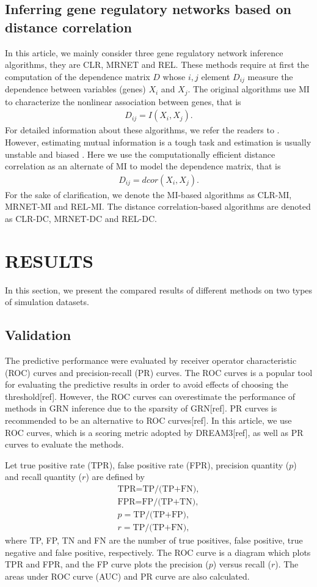 \documentclass{bioinfo}
\begin{document}
\subsection{Inferring gene regulatory networks based on distance correlation}
In this article, we mainly consider three gene regulatory network inference algorithms, they are CLR, MRNET and REL.
These methods require at first the computation of the dependence matrix $D$ whose $i,j$ element
$D_{ij}$ measure the dependence between variables (genes) $X_i$ and
$X_j$. The original algorithms use MI to characterize the nonlinear
association between genes, that is
\begin{align*}
D_{ij}=I(X_i,X_j).
\end{align*}
For detailed information about these algorithms, we refer the
readers to \citep{faith2007large,meyer2008minet,butte2000mutual}. However, estimating mutual information
is a tough task and estimation is usually unstable and biased \citep{meyer2008minet, de2012bagging}. Here we use the computationally efficient distance correlation as an alternate of MI to
model the dependence matrix, that is
\begin{align*}
D_{ij}=dcor(X_i,X_j).
\end{align*}
For the sake of clarification, we denote the MI-based algorithms as
CLR-MI, MRNET-MI and REL-MI. The distance correlation-based
algorithms are denoted as CLR-DC, MRNET-DC and REL-DC.


\section{RESULTS}
In this section, we present the compared results of different methods on two types of simulation datasets.
\subsection{Validation}
The predictive performance were evaluated by receiver operator characteristic (ROC) curves and precision-recall (PR) curves.
The ROC curves is a popular tool for evaluating the predictive results in order to avoid effects of choosing the threshold[ref].  However,
the ROC curves can overestimate the performance of methods in GRN inference due to the sparsity of GRN[ref]. PR curves is recommended to be an alternative to ROC curves[ref].  In this article, we use ROC curves, which is a scoring metric adopted by DREAM3[ref], as well as PR curves to evaluate the methods.

Let true positive rate (TPR), false positive rate (FPR), precision quantity ($p$) and recall quantity ($r$) are defined by
\begin{align*}
    \mbox{TPR=TP/(TP+FN}),\\
    \mbox{FPR=FP/(TP+TN)},\\
    p=\mbox{TP/(TP+FP)},\\
    r=\mbox{TP/(TP+FN)},
\end{align*}
where TP, FP, TN and FN are the number of true positives, false positive, true negative and false positive, respectively. The ROC curve is a diagram which plots TPR and FPR, and the FP curve plots the precision ($p$)  versus recall ($r$). The areas under ROC curve (AUC) and PR curve are also calculated.
\end{document}
